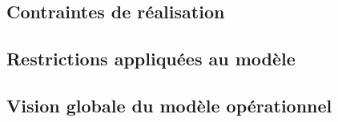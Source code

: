 \subsection{Contraintes de réalisation}


\subsection{Restrictions appliquées au modèle}


\subsection{Vision globale du modèle opérationnel}
